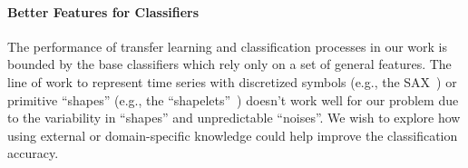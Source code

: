 \paragraph{Better Features for Classifiers} The performance of transfer learning and classification processes in our work is bounded by the base classifiers which rely only on a set of general features. The line of work to represent time series with discretized symbols (e.g., the SAX~\cite{sax}) or primitive ``shapes'' (e.g., the ``shapelets''~\cite{shapelet1, shapelet2}) doesn't work well for our problem due to the variability in ``shapes'' and unpredictable ``noises''. We wish to explore how using external or domain-specific knowledge could help improve the classification accuracy. 

